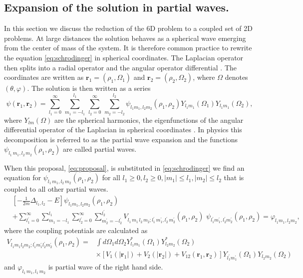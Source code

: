 \documentclass[mathpazo]{cicp}
\theoremstyle{definition}
\numberwithin{equation}{section}
\providecommand{\wv}{}
\providecommand{\hbz}{}
\begin{document}
\subsection{Expansion of the solution in partial waves.}
In this section we discuss the reduction of the 6D problem to a
coupled set of 2D problems.  At large distances \hbz{the} solution behaves as
a spherical \hbz{wave} emerging from the center of mass of the system.  It
is therefore common practice \cite{baertschy2001,vanroose2006double}
to rewrite the equation \eqref{eq:schrodinger} in spherical
coordinates.  \wv{The Laplacian operator then splits into a radial
operator and the angular operator differential  \cite{arfken}.}  The coordinates are
written as $\mathbold{r}_1 = (\rho_1, \Omega_1)$ and $\mathbold{r}_2 =
(\rho_2, \Omega_2)$, where $\Omega$ denotes $(\theta, \varphi)$.
\wv{The solution is then written} as a series
\begin{equation}\label{eq:proposal}
 \psi(\mathbold{r}_1,\mathbold{r}_2) = \wv{\sum_{l_1=0}^{\infty}\, \sum_{m_1=-l_1}^{l_1}\,\sum_{l_2=0}^\infty\, \sum_{m_2=-l_2}^{l_2} }  \psi_{l_1m_1,l_2m_2}(\rho_1,\rho_2) Y_{l_1m_1}(\Omega_1) Y_{l_1m_1}(\Omega_2), 
\end{equation}
where $Y_{lm}(\Omega)$ are the spherical harmonics, \wv{the
  eigenfunctions of the angular differential operator of the Laplacian
  in spherical coordinates \cite{arfken}.  In physics this decomposition is referred
  to as the partial wave expansion and the functions
  $\psi_{l_1\,m_1,l_2\,m_2}(\rho_1,\rho_2)$ are called partial waves.}

When this proposal, \eqref{eq:proposal}, is \hbz{substituted} in \eqref{eq:schrodinger} we find
an equation for $\psi_{l_1\,m_1,l_2\,m_2}(\rho_1,\rho_2)$ for all
$l_1 \ge 0,l_2 \ge 0 ,|m_1| \le l_1 ,|m_2| \le l_2$ that is
coupled to all other partial waves.
\begin{equation}\label{eq:coupled}
\begin{aligned}
 &\left[-\frac{1}{2m}  \Delta_{l_1,l_2} -E\right]  \psi_{l_1 m_1,l_2 m_2}(\rho_1,\rho_2) \\
&+ \sum_{l^{\prime}_1=0}^{\infty} \sum_{m_1=-l_1}^{l_1} \sum_{l_2^\prime = 0}^\infty \sum_{m^\prime_2=-l_2^\prime}^{l_2^\prime} V_{l_1\,m_1\,l_2\,m_2 ; l_1^\prime\,m_1^\prime,l_2^\prime\, m_2^\prime}(\rho_1,\rho_2)\,\, \psi_{l_1^\prime m_1^\prime,l_2^\prime m_2^\prime}(\rho_1,\rho_2)  = \varphi_{l_1m_1,l_2m_2},
\end{aligned}
\end{equation}
where the coupling potentials are calculated as
\begin{equation}\label{eq:coupled_potential}
\begin{aligned}
 V_{l_1m_1l_2 m_2;l_1^\prime m_1^\prime l_2^\prime m_2^\prime}(\rho_1,\rho_2 )= &\int d\Omega_1 d\Omega_2  Y^*_{l_1m_1}(\Omega_1)Y^*_{l_2m_2}(\Omega_2)\\
&\times \left[V_1(|\mathbold{r}_1|) + V_2(|\mathbold{r}_2|) + V_{12}(\mathbold{r}_1,\mathbold{r}_2)\right]Y_{l^\prime_1 m^\prime_1}(\Omega_1)Y_{l_2m_2}(\Omega_2) 
\end{aligned}
\end{equation}
and $\varphi_{l_1\,m_1,l_1\,m_2}$ is partial wave of the right hand side.
\end{document}

